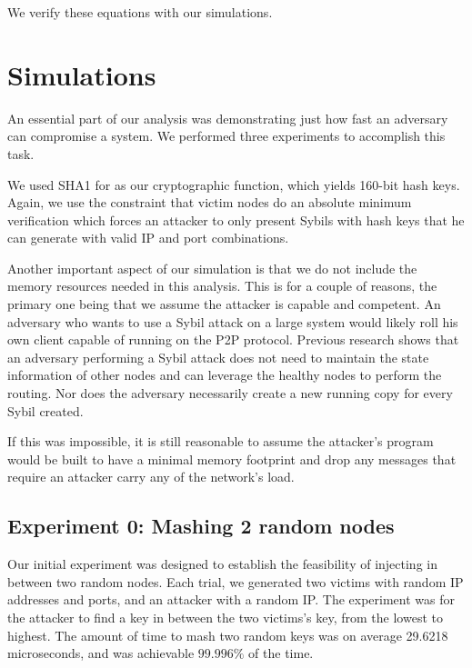 \documentclass[11pt,conference]{IEEEtran}
\begin{document}
We verify these equations with our simulations.

\section{Simulations}
An essential part of our analysis was demonstrating just how fast an adversary can compromise a system.
We performed three experiments to accomplish this task.

We used SHA1 for as our cryptographic function, which yields 160-bit hash keys.
Again, we use the constraint that victim nodes do an absolute minimum verification which forces an attacker to only present Sybils with hash keys that he can generate with valid IP and port combinations.

Another important aspect of our simulation is that we do not include the memory resources needed in this analysis.
This is for a couple of reasons, the primary one being that we assume the attacker is capable and competent.
An adversary who wants to use a Sybil attack on a large system would likely roll his own client capable of running on the P2P protocol.
Previous research \cite{sybilbit} shows that an adversary performing a Sybil attack does not need to maintain the state information of other nodes and can leverage the healthy nodes to perform the routing.
Nor does the adversary necessarily create a new running copy for every Sybil created. 

If this was impossible, it is still reasonable to assume the attacker's program would be built to have a minimal memory footprint and drop any messages that require an attacker carry any of the network's load.









\subsection{Experiment 0: Mashing 2 random nodes}
Our initial experiment was designed to establish the feasibility of injecting in between two random nodes.
Each trial, we generated two victims with random IP addresses and ports, and an attacker with a random IP.
The experiment was for the attacker to find a key in between the two victims's key, from the lowest to highest.
The amount of time to mash two random keys was on average 29.6218 microseconds, and was achievable $ 99.996\%$ of the time.
\end{document}
